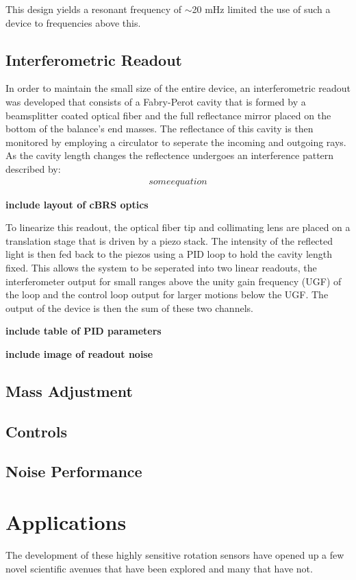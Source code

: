 \documentclass [12pt, proquest]{uwthesis}[2019]
\begin{document}
This design yields a resonant frequency of $\sim$20 mHz limited the use of such a device to frequencies above this. 

\section{Interferometric Readout}
In order to maintain the small size of the entire device, an interferometric readout was developed that consists of a Fabry-Perot cavity that is formed by a beamsplitter coated optical fiber and the full reflectance mirror placed on the bottom of the balance's end masses. The reflectance of this cavity is then monitored by employing a circulator to seperate the incoming and outgoing rays. As the cavity length changes the reflectence undergoes an interference pattern described by:
\begin{align}
some equation
\end{align}

\textbf{include layout of cBRS optics}

To linearize this readout, the optical fiber tip and collimating lens are placed on a translation stage that is driven by a piezo stack. The intensity of the reflected light is then fed back to the piezos using a PID loop to hold the cavity length fixed. This allows the system to be seperated into two linear readouts, the interferometer output for small ranges above the unity gain frequency (UGF) of the loop and the control loop output for larger motions below the UGF. The output of the device is then the sum of these two channels.

\textbf{include table of PID parameters}

\textbf{include image of readout noise}

\section{Mass Adjustment}
\section{Controls}
\section{Noise Performance}

\chapter{Applications}
\quad The development of these highly sensitive rotation sensors have opened up a few novel scientific avenues that have been explored and many that have not.
\end{document}
